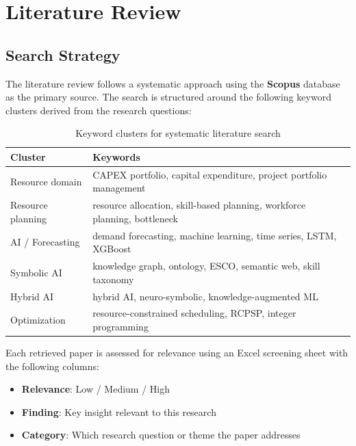 \chapter{Literature Review}
\label{chap:literature_review}

\section{Search Strategy}
\label{sec:search_strategy}

The literature review follows a systematic approach using the \textbf{Scopus} database as the primary source. The search is structured around the following keyword clusters derived from the research questions:

\begin{table}[htbp]
  \centering
  \caption{Keyword clusters for systematic literature search}
  \label{tab:keywords}
  \begin{tabular}{@{}ll@{}}
    \toprule
    \textbf{Cluster} & \textbf{Keywords} \\
    \midrule
    Resource domain   & CAPEX portfolio, capital expenditure, project portfolio management \\
    Resource planning & resource allocation, skill-based planning, workforce planning, bottleneck \\
    AI / Forecasting  & demand forecasting, machine learning, time series, LSTM, XGBoost \\
    Symbolic AI       & knowledge graph, ontology, ESCO, semantic web, skill taxonomy \\
    Hybrid AI         & hybrid AI, neuro-symbolic, knowledge-augmented ML \\
    Optimization      & resource-constrained scheduling, RCPSP, integer programming \\
    \bottomrule
  \end{tabular}
\end{table}

Each retrieved paper is assessed for relevance using an Excel screening sheet with the following columns:
\begin{itemize}
  \item \textbf{Relevance}: Low / Medium / High
  \item \textbf{Finding}: Key insight relevant to this research
  \item \textbf{Category}: Which research question or theme the paper addresses
\end{itemize}


